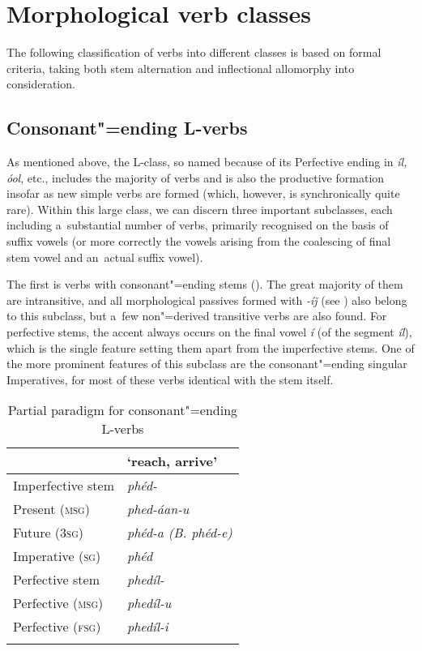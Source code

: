 \section{Morphological verb classes}
\label{sec:8-3}


The following classification of verbs into different classes is based on formal criteria, taking both stem alternation and inflectional allomorphy into consideration.


\subsection{Consonant"=ending L-verbs}
\label{subsec:8-3-1}


As mentioned above, the L-class, so named because of its Perfective ending in \textit{íl, óol}, etc., includes the majority of verbs and is also the productive formation insofar as new simple verbs are formed (which, however, is synchronically quite rare). Within this large class, we can discern three important subclasses, each including a~substantial number of verbs, primarily recognised on the basis of suffix vowels (or more correctly the vowels arising from the coalescing of final stem vowel and an~actual suffix vowel).


The first is verbs with consonant"=ending stems (). The great majority of them are intransitive, and all morphological passives formed with \textit{-íǰ} (see ) also belong to this subclass, but a~few non"=derived transitive verbs are also found. For perfective stems, the accent always occurs on the final vowel \textit{í} (of the segment \textit{íl}), which is the single feature setting them apart from the imperfective stems. One of the more prominent features of this subclass are the consonant"=ending singular Imperatives, for most of these verbs identical with the stem itself.


\begin{table}[ht]
\caption{Partial paradigm for consonant"=ending L-verbs}
\begin{tabularx}{.75\textwidth}{ Q Q }
\lsptoprule
&
`reach, arrive'\\\hline
Imperfective stem &
\textit{phéd-} \\
Present (\textsc{msg}) &
\textit{phed-áan-u} \\
Future (\textsc{3sg}) &
\textit{phéd-a (B. phéd-e)} \\
Imperative (\textsc{sg}) &
\textit{phéd} \\
Perfective stem &
\textit{phedíl-} \\
Perfective (\textsc{msg}) &
\textit{phedíl-u} \\
Perfective (\textsc{fsg}) &
\textit{phedíl-i} \\\lspbottomrule
\end{tabularx}
\label{tab:8-4}
\end{table}


